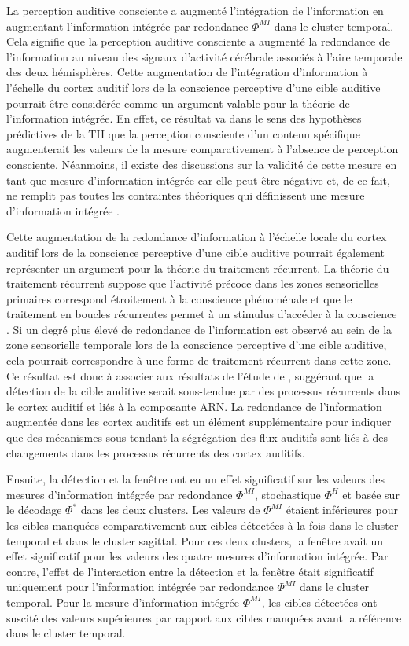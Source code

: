 La perception auditive consciente a augmenté l'intégration de l'information en augmentant l'information intégrée par redondance $\Phi^{MI}$ dans le cluster temporal. 
Cela signifie que la perception auditive consciente a augmenté la redondance de l'information au niveau des signaux d'activité cérébrale associés à l'aire temporale des deux hémisphères. 
Cette augmentation de l'intégration d'information à l'échelle du cortex auditif lors de la conscience perceptive d'une cible auditive pourrait être considérée comme un argument valable pour la théorie de l'information intégrée. 
En effet, ce résultat va dans le sens des hypothèses prédictives de la TII que la perception consciente d'un contenu spécifique augmenterait les valeurs de la mesure comparativement à l'absence de perception consciente. 
Néanmoins, il existe des discussions sur la validité de cette mesure en tant que mesure d'information intégrée car elle peut être négative et, de ce fait, ne remplit pas toutes les contraintes théoriques qui définissent une mesure d'information intégrée \citep{oizumi2016measuring}. 

Cette augmentation de la redondance d'information à l'échelle locale du cortex auditif lors de la conscience perceptive d'une cible auditive pourrait également représenter un argument pour la théorie du traitement récurrent. 
La théorie du traitement récurrent suppose que l'activité précoce dans les zones sensorielles primaires correspond étroitement à la conscience phénoménale et que le traitement en boucles récurrentes permet à un stimulus d'accéder à la conscience \citep{lamme2000distinct, lamme2003visual, lamme2006towards}. 
Si un degré plus élevé de redondance de l'information est observé au sein de la zone sensorielle temporale lors de la conscience perceptive d'une cible auditive, cela pourrait correspondre à une forme de traitement récurrent dans cette zone. 
Ce résultat est donc à associer aux résultats de l'étude de \cite{giani2015detecting}, suggérant que la détection de la cible auditive serait sous-tendue par des processus récurrents dans le cortex auditif et liés à la composante ARN. 
La redondance de l'information augmentée dans les cortex auditifs est un élément supplémentaire pour indiquer que des mécanismes sous-tendant la ségrégation des flux auditifs sont liés à des changements dans les processus récurrents des cortex auditifs. 

Ensuite, la détection et la fenêtre ont eu un effet significatif sur les valeurs des mesures d'information intégrée par redondance $\Phi^{MI}$, stochastique $\Phi^{H}$ et basée sur le décodage $\Phi^{*}$ dans les deux clusters. 
Les valeurs de $\Phi^{MI}$ étaient inférieures pour les cibles manquées comparativement aux cibles détectées à la fois dans le cluster temporal et dans le cluster sagittal. 
Pour ces deux clusters, la fenêtre avait un effet significatif pour les valeurs des quatre mesures d'information intégrée. 
Par contre, l'effet de l'interaction entre la détection et la fenêtre était significatif uniquement pour l'information intégrée par redondance $\Phi^{MI}$ dans le cluster temporal. 
Pour la mesure d'information intégrée $\Phi^{MI}$, les cibles détectées ont suscité des valeurs supérieures par rapport aux cibles manquées avant la référence dans le cluster temporal. 

